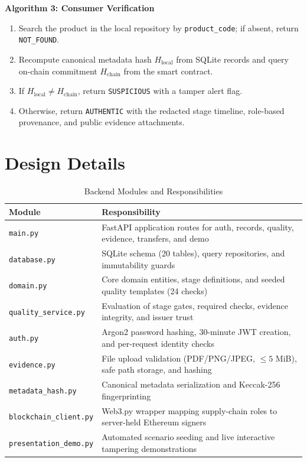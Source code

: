 \documentclass[12pt,a4paper]{report}
\begin{document}
\vspace{0.4cm}
\noindent \textbf{Algorithm 3: Consumer Verification}
\begin{enumerate}[leftmargin=1.8em, itemsep=3pt, parsep=0pt]
    \item Search the product in the local repository by \texttt{product\_code}; if absent, return \texttt{NOT\_FOUND}.
    \item Recompute canonical metadata hash $H_{\text{local}}$ from SQLite records and query on-chain commitment $H_{\text{chain}}$ from the smart contract.
    \item If $H_{\text{local}} \neq H_{\text{chain}}$, return \texttt{SUSPICIOUS} with a tamper alert flag.
    \item Otherwise, return \texttt{AUTHENTIC} with the redacted stage timeline, role-based provenance, and public evidence attachments.
\end{enumerate}

\clearpage
\section{Design Details}
\begin{table}[H]
\centering
\caption{Backend Modules and Responsibilities}
\label{tab:modules}
\small
\renewcommand{\arraystretch}{1.22}
\begin{tabularx}{\textwidth}{L{4.2cm} Y}
\toprule
\textbf{Module} & \textbf{Responsibility} \\
\midrule
\texttt{main.py} & FastAPI application routes for auth, records, quality, evidence, transfers, and demo \\
\texttt{database.py} & SQLite schema (20 tables), query repositories, and immutability guards \\
\texttt{domain.py} & Core domain entities, stage definitions, and seeded quality templates (24 checks) \\
\texttt{quality\_service.py} & Evaluation of stage gates, required checks, evidence integrity, and issuer trust \\
\texttt{auth.py} & Argon2 password hashing, 30-minute JWT creation, and per-request identity checks \\
\texttt{evidence.py} & File upload validation (PDF/PNG/JPEG, $\le 5$ MiB), safe path storage, and hashing \\
\texttt{metadata\_hash.py} & Canonical metadata serialization and Keccak-256 fingerprinting \\
\texttt{blockchain\_client.py} & Web3.py wrapper mapping supply-chain roles to server-held Ethereum signers \\
\texttt{presentation\_demo.py} & Automated scenario seeding and live interactive tampering demonstrations \\
\bottomrule
\end{tabularx}
\end{table}
\end{document}
